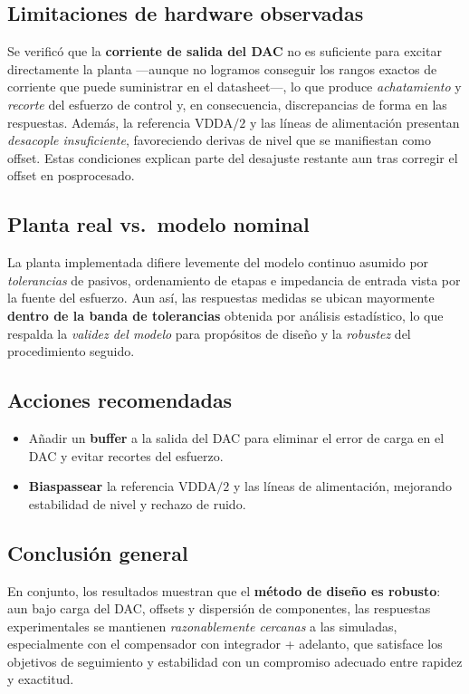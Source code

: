 \subsection*{Limitaciones de hardware observadas}
Se verificó que la \textbf{corriente de salida del DAC} no es suficiente para excitar directamente la planta ---aunque no logramos conseguir los rangos exactos de corriente que puede suministrar en el datasheet---, lo que produce \emph{achatamiento} y \emph{recorte} del esfuerzo de control y, en consecuencia, discrepancias de forma en las respuestas. Además, la referencia $\mathrm{VDDA}/2$ y las líneas de alimentación presentan \emph{desacople insuficiente}, favoreciendo derivas de nivel que se manifiestan como offset. Estas condiciones explican parte del desajuste restante aun tras corregir el offset en posprocesado.

\subsection*{Planta real vs.\ modelo nominal}
La planta implementada difiere levemente del modelo continuo asumido por \emph{tolerancias} de pasivos, ordenamiento de etapas e impedancia de entrada vista por la fuente del esfuerzo. Aun así, las respuestas medidas se ubican mayormente \textbf{dentro de la banda de tolerancias} obtenida por análisis estadístico, lo que respalda la \emph{validez del modelo} para propósitos de diseño y la \emph{robustez} del procedimiento seguido.



\subsection*{Acciones recomendadas}
\begin{itemize}
	\item Añadir un \textbf{buffer} a la salida del DAC para eliminar el error de carga en el DAC y evitar recortes del esfuerzo.
	\item \textbf{Biaspassear} la referencia $\mathrm{VDDA}/2$ y las líneas de alimentación, mejorando estabilidad de nivel y rechazo de ruido.
\end{itemize}

\subsection*{Conclusión general}
En conjunto, los resultados muestran que el \textbf{método de diseño es robusto}: aun bajo carga del DAC, offsets y dispersión de componentes, las respuestas experimentales se mantienen \emph{razonablemente cercanas} a las simuladas, especialmente con el compensador  con integrador + adelanto, que satisface los objetivos de seguimiento y estabilidad con un compromiso adecuado entre rapidez y exactitud.
